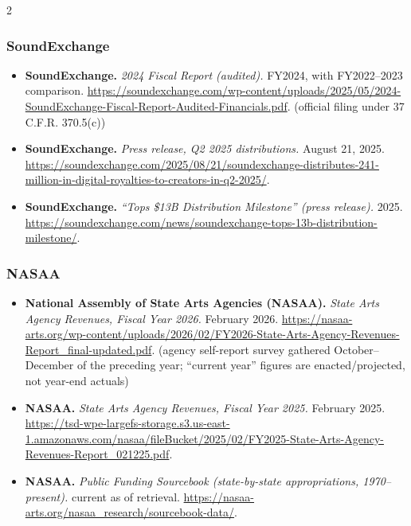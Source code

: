 {\begin{multicols}{2}
\subsubsection*{SoundExchange}
\begin{itemize}[itemsep=0pt,topsep=1pt,parsep=0pt,partopsep=0pt,leftmargin=1em]
\item \textbf{SoundExchange.} \textit{2024 Fiscal Report (audited).} FY2024, with FY2022--2023 comparison. \url{https://soundexchange.com/wp-content/uploads/2025/05/2024-SoundExchange-Fiscal-Report-Audited-Financials.pdf}. {\color{ammuted}(official filing under 37 C.F.R. 370.5(c))}
\item \textbf{SoundExchange.} \textit{Press release, Q2 2025 distributions.} August 21, 2025. \url{https://soundexchange.com/2025/08/21/soundexchange-distributes-241-million-in-digital-royalties-to-creators-in-q2-2025/}.
\item \textbf{SoundExchange.} \textit{“Tops \$13B Distribution Milestone” (press release).} 2025. \url{https://soundexchange.com/news/soundexchange-tops-13b-distribution-milestone/}.
\end{itemize}
\subsubsection*{NASAA}
\begin{itemize}[itemsep=0pt,topsep=1pt,parsep=0pt,partopsep=0pt,leftmargin=1em]
\item \textbf{National Assembly of State Arts Agencies (NASAA).} \textit{State Arts Agency Revenues, Fiscal Year 2026.} February 2026. \url{https://nasaa-arts.org/wp-content/uploads/2026/02/FY2026-State-Arts-Agency-Revenues-Report_final-updated.pdf}. {\color{ammuted}(agency self-report survey gathered October--December of the preceding year; “current year” figures are enacted/projected, not year-end actuals)}
\item \textbf{NASAA.} \textit{State Arts Agency Revenues, Fiscal Year 2025.} February 2025. \url{https://tsd-wpe-largefs-storage.s3.us-east-1.amazonaws.com/nasaa/fileBucket/2025/02/FY2025-State-Arts-Agency-Revenues-Report_021225.pdf}.
\item \textbf{NASAA.} \textit{Public Funding Sourcebook (state-by-state appropriations, 1970--present).} current as of retrieval. \url{https://nasaa-arts.org/nasaa_research/sourcebook-data/}.
\end{itemize}

\end{multicols}}
